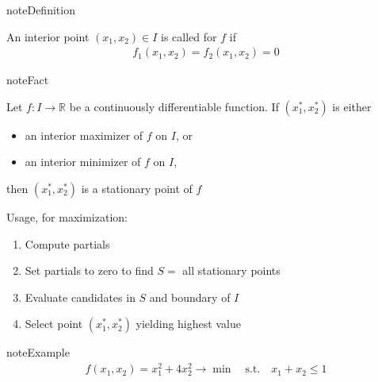 \documentclass[letterpaper,10pt,english]{jupyterBook}
\begin{document}
\begin{sphinxadmonition}{note}{Definition}

\sphinxAtStartPar
An interior point \((x_1, x_2) \in I\) is called  for \(f\) if
\begin{equation*}
\begin{split}
f_1(x_1, x_2) = f_2(x_1, x_2) = 0
\end{split}
\end{equation*}\end{sphinxadmonition}

\begin{sphinxadmonition}{note}{Fact}

\sphinxAtStartPar
Let \(f \colon I \to \mathbb{R}\) be a continuously differentiable function.
If \((x_1^*, x_2^*)\) is either
\begin{itemize}
\item {} 
\sphinxAtStartPar
an interior maximizer of \(f\) on \(I\), or

\item {} 
\sphinxAtStartPar
an interior minimizer of \(f\) on \(I\),

\end{itemize}

\sphinxAtStartPar
then \((x_1^*, x_2^*)\) is a stationary point of \(f\)
\end{sphinxadmonition}

\sphinxAtStartPar
Usage, for maximization:
\begin{enumerate}
%
\item {} 
\sphinxAtStartPar
Compute partials

\item {} 
\sphinxAtStartPar
Set partials to zero to find \(S =\) all stationary points

\item {} 
\sphinxAtStartPar
Evaluate candidates in \(S\) and boundary of \(I\)

\item {} 
\sphinxAtStartPar
Select point \((x^*_1, x_2^*)\) yielding highest value

\end{enumerate}

\begin{sphinxadmonition}{note}{Example}
\begin{equation*}
\begin{split}
f(x_1, x_2) = x_1^2 + 4 x_2^2 \rightarrow \min
\quad \mathrm{s.t.} \quad
x_1 + x_2 \leq 1
\end{split}
\end{equation*}\end{sphinxadmonition}
\end{document}

